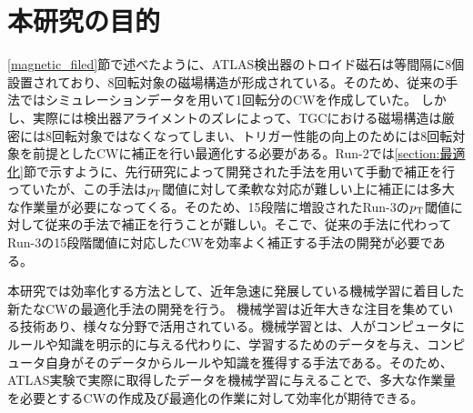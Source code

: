 \section{本研究の目的}
\ref{magnetic_filed}節で述べたように、ATLAS検出器のトロイド磁石は等間隔に8個設置されており、8回転対象の磁場構造が形成されている。そのため、従来の手法ではシミュレーションデータを用いて1回転分のCWを作成していた。
しかし、実際には検出器アライメントのズレによって、TGCにおける磁場構造は厳密には8回転対象ではなくなってしまい、トリガー性能の向上のためには8回転対象を前提としたCWに補正を行い最適化する必要がある。Run-2では\ref{section:最適化}節で示すように、先行研究によって開発された手法を用いて手動で補正を行っていたが、この手法は$p_{\rm{T}}$閾値に対して柔軟な対応が難しい上に補正には多大な作業量が必要になってくる。そのため、15段階に増設されたRun-3の$p_{\rm{T}}$閾値に対して従来の手法で補正を行うことが難しい。そこで、従来の手法に代わってRun-3の15段階閾値に対応したCWを効率よく補正する手法の開発が必要である。

本研究では効率化する方法として、近年急速に発展している機械学習に着目した新たなCWの最適化手法の開発を行う。
機械学習は近年大きな注目を集めている技術あり、様々な分野で活用されている。機械学習とは、人がコンピュータにルールや知識を明示的に与える代わりに、学習するためのデータを与え、コンピュータ自身がそのデータからルールや知識を獲得する手法である。そのため、ATLAS実験で実際に取得したデータを機械学習に与えることで、多大な作業量を必要とするCWの作成及び最適化の作業に対して効率化が期待できる。














